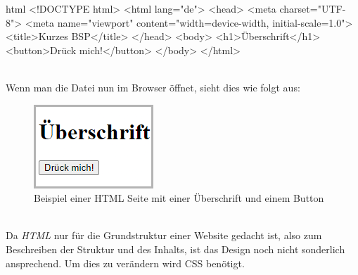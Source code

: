 		\begin{code}{html}
			<!DOCTYPE html>
			<html lang="de">
				<head>
					<meta charset="UTF-8">
					<meta name="viewport" content="width=device-width, initial-scale=1.0">
					<title>Kurzes BSP</title>
				</head>
				<body>
					<h1>Überschrift</h1>
					<button>Drück mich!</button>
				</body>
			</html>
		\end{code}
	\label{list:htmlbsp} ~\\
		Wenn man die Datei nun im Browser öffnet, sieht dies wie folgt aus:
		\begin{figure}[H]
			\centering
			\includegraphics[width=0.2\linewidth]{images/ldehner_study/html1}
			\caption[HTML Beispielseite]{Beispiel einer HTML Seite mit einer Überschrift und einem Button}
			\label{fig:htmlbsp}
		\end{figure}
		~\\
		Da \textit{HTML} nur für die Grundstruktur einer Website gedacht ist, also zum Beschreiben der Struktur und des Inhalts, ist das Design noch nicht sonderlich ansprechend. Um dies zu verändern wird CSS benötigt.
		
